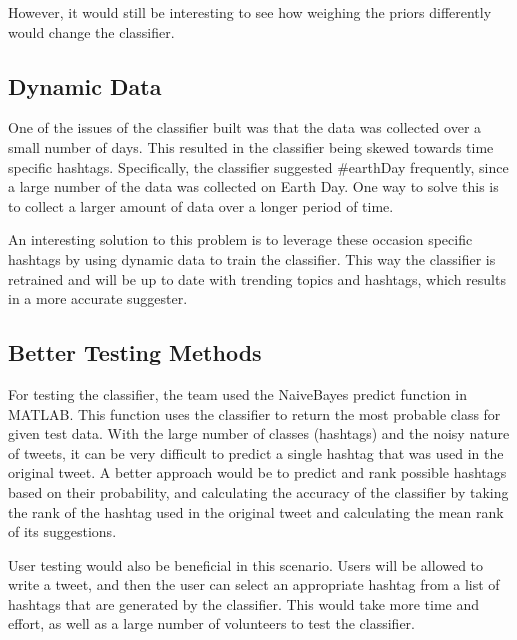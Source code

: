 \documentclass[conference]{IEEEtran}
\begin{document}
However, it would still be interesting to see how weighing the priors differently would change the classifier.
\subsection{Dynamic Data}
One of the issues of the classifier built was that the data was collected over a small number of days. This resulted in the classifier being skewed towards time specific hashtags. Specifically, the classifier suggested \#earthDay frequently, since a large number of the data was collected on Earth Day. One way to solve this is to collect a larger amount of data over a longer period of time.

An interesting solution to this problem is to leverage these occasion specific hashtags by using dynamic data to train the classifier. This way the classifier is retrained and will be up to date with trending topics and hashtags, which results in a more accurate suggester.
\subsection{Better Testing Methods}
For testing the classifier, the team used the NaiveBayes predict function in MATLAB. This function uses the classifier to return the most probable class for given test data. With the large number of classes (hashtags) and the noisy nature of tweets, it can be very difficult to predict a single hashtag that was used in the original tweet. A better approach would be to predict and rank possible hashtags based on their probability, and calculating the accuracy of the classifier by taking the rank of the hashtag used in the original tweet and calculating the mean rank of its suggestions.

User testing would also be beneficial in this scenario. Users will be allowed to write a tweet, and then the user can select an appropriate hashtag from a list of hashtags that are generated by the classifier. This would take more time and effort, as well as a large number of volunteers to test the classifier.



\end{document}
